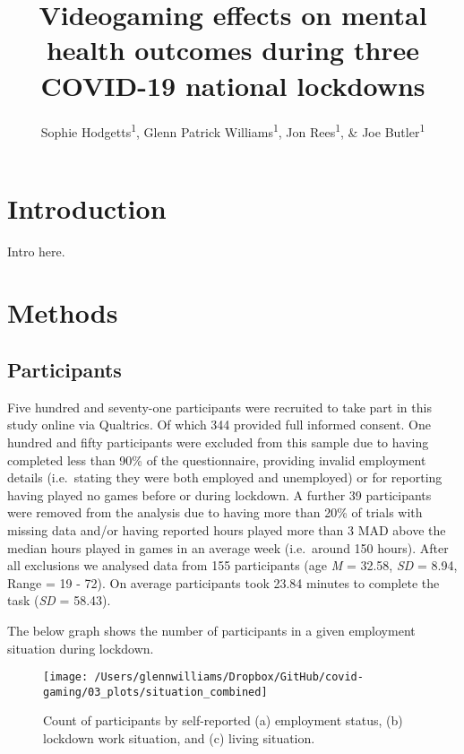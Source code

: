 \documentclass[
  english,
  jou,floatsintext]{apa6}
\title{Videogaming effects on mental health outcomes during three COVID-19 national lockdowns}
\author{Sophie Hodgetts\textsuperscript{1}, Glenn Patrick Williams\textsuperscript{1}, Jon Rees\textsuperscript{1}, \& Joe Butler\textsuperscript{1}}
\date{}
\affiliation{\vspace{0.5cm}\textsuperscript{1} University of Sunderland}
\begin{document}
\maketitle

\hypertarget{introduction}{%
\section{Introduction}\label{introduction}}

Intro here.

\hypertarget{methods}{%
\section{Methods}\label{methods}}

\hypertarget{participants}{%
\subsection{Participants}\label{participants}}

Five hundred and seventy-one participants were recruited to take part in this study online via Qualtrics. Of which 344 provided full informed consent. One hundred and fifty participants were excluded from this sample due to having completed less than 90\% of the questionnaire, providing invalid employment details (i.e.~stating they were both employed and unemployed) or for reporting having played no games before or during lockdown. A further 39 participants were removed from the analysis due to having more than 20\% of trials with missing data and/or having reported hours played more than 3 MAD above the median hours played in games in an average week (i.e.~around 150 hours). After all exclusions we analysed data from 155 participants (age \emph{M} = 32.58, \emph{SD} = 8.94, Range = 19 - 72). On average participants took 23.84 minutes to complete the task (\emph{SD} = 58.43).

The below graph shows the number of participants in a given employment situation during lockdown.

\begin{figure*}[!htbp]

{\centering \texttt{[image: /Users/glennwilliams/Dropbox/GitHub/covid-gaming/03\_plots/situation\_combined]} 

}

\caption{Count of participants by self-reported (a) employment status, (b) lockdown work situation, and (c) living situation.}\label{fig:situations-plot}
\end{figure*}
\end{document}
